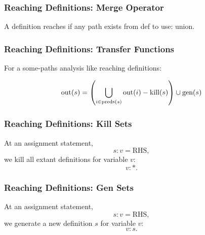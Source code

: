 \documentclass{beamer}
\begin{document}
\begin{frame}
  \frametitle{Reaching Definitions: Merge Operator}

A definition reaches if \alert{any} path exists from def to use: \alert{union}.

\begin{center}
\end{center}

\end{frame}

\begin{frame}
  \frametitle{Reaching Definitions: Transfer Functions}

For a some-paths analysis like reaching definitions:

\[ \mbox{out}(s) = \left( \bigcup_{i \in \mbox{\scriptsize preds}(s)} 
\mbox{out}(i) - \mbox{kill}(s) \right) \cup \mbox{gen}(s)
\]
\end{frame}

\begin{frame}
  \frametitle{Reaching Definitions: Kill Sets}

At an assignment statement,
\[ s: v = \mbox{RHS}, \]
we kill all extant definitions for variable $v$:
\[ v:*. \]
\end{frame}

\begin{frame}
  \frametitle{Reaching Definitions: Gen Sets}

At an assignment statement,
\[ s: v = \mbox{RHS}, \]
we generate a new definition $s$ for variable $v$:
\[ v:s. \]
\end{frame}
\end{document}

